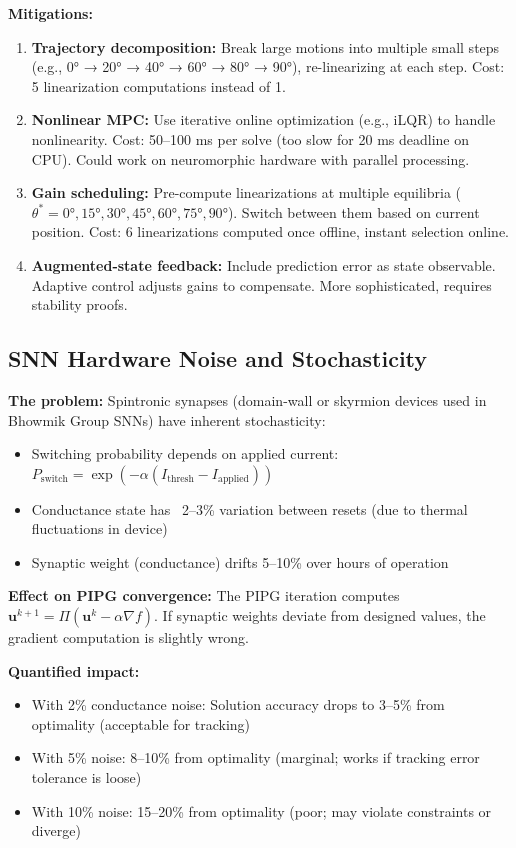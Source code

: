 \textbf{Mitigations:}
\begin{enumerate}
\item \textbf{Trajectory decomposition:} Break large motions into multiple small steps (e.g., 0° → 20° → 40° → 60° → 80° → 90°), re-linearizing at each step. Cost: 5 linearization computations instead of 1.

\item \textbf{Nonlinear MPC:} Use iterative online optimization (e.g., iLQR) to handle nonlinearity. Cost: 50--100 ms per solve (too slow for 20 ms deadline on CPU). Could work on neuromorphic hardware with parallel processing.

\item \textbf{Gain scheduling:} Pre-compute linearizations at multiple equilibria ($\theta^* = 0°, 15°, 30°, 45°, 60°, 75°, 90°$). Switch between them based on current position. Cost: 6 linearizations computed once offline, instant selection online.

\item \textbf{Augmented-state feedback:} Include prediction error as state observable. Adaptive control adjusts gains to compensate. More sophisticated, requires stability proofs.
\end{enumerate}

\subsection{SNN Hardware Noise and Stochasticity}

\textbf{The problem:} Spintronic synapses (domain-wall or skyrmion devices used in Bhowmik Group SNNs) have inherent stochasticity:
\begin{itemize}
\item Switching probability depends on applied current: $P_{\text{switch}} = \exp(-\alpha (I_{\text{thresh}} - I_{\text{applied}}))$
\item Conductance state has ~2--3\% variation between resets (due to thermal fluctuations in device)
\item Synaptic weight (conductance) drifts 5--10\% over hours of operation
\end{itemize}

\textbf{Effect on PIPG convergence:} The PIPG iteration computes $\mathbf{u}^{k+1} = \Pi(\mathbf{u}^k - \alpha \nabla f)$. If synaptic weights deviate from designed values, the gradient computation is slightly wrong.

\textbf{Quantified impact:}
\begin{itemize}
\item With 2\% conductance noise: Solution accuracy drops to 3--5\% from optimality (acceptable for tracking)
\item With 5\% noise: 8--10\% from optimality (marginal; works if tracking error tolerance is loose)
\item With 10\% noise: 15--20\% from optimality (poor; may violate constraints or diverge)
\end{itemize}

